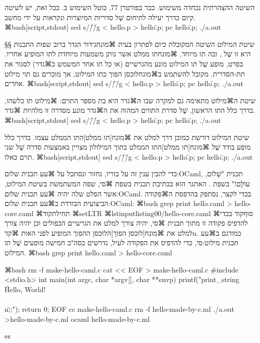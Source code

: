 השיטה ההצהרתית נכחדה משימוש. כבר בפורטרן 77, בוטל השימוש
ב.
בכל זאת, יש לשיטה קיום כדרך יעילה לתיחום שֶׁל סדריות המיוצרות ונקראות על ידי מחשב.
⌘bash[script,stdout]
sed s/\'/\"/g < hello.p > hello\".p; pc hello\".p; ./a.out
\END

§§ שיטת המילוט
השיטה המקובלת כיום לפתרון בעית ⌘מונח{גידור הגדר} ברוב שפות התכנות היא זו שֶׁל
, ובה תו מיוחד, ⌘מונח{תו ממלט} אשר נותן משמעות מיוחדת לתו המופיע אחריו.
בפרט, מופע שֶׁל תו המילוט מונע מהגרשיים (או כל תו אחר המשמש כ⌘גדר) לסגור את
תת-הסדרית. מקובל להשתמש ב⌘מונח{לוכסן הפוך} כתו המילוט, אך מוכרים גם תוי מילוט
אחרים.
⌘bash[script,stdout]
sed s/\'/\"/g < hello.p > hello\".p; pc hello\".p; ./a.out
\END

שיטת ה⌘מילוט מתאימה גם למקרה שבו ה⌘גדר היא בת מספר התוים: ⌘מילוט תו כלשהו, בדרך
כלל התו הראשון, שֶׁל סדרת התווים המהוה את ה⌘גדר מונע מסדרה זו מלהיות ⌘גדר.
⌘bash[script,stdout]
sed s/\'/\"/g < hello.p > hello\".p; pc hello\".p; ./a.out
\END

שיטת המילוט דורשת כמובן דרך למלט את ⌘מונח[תו ממלט]{התו הממלט} עצמו. בדרך כלל
מופע בודד שֶׁל ⌘מונח[תו ממלט]{התו הממלט} בתוך המילולון מצויין באמצעות סדרה שֶׁל
שני תוים כאלו.
⌘bash[script,stdout]
sed s/\'/\"/g < hello.p > hello\".p; pc hello\".p; ./a.out
\END

כדי להבין ענין זה על בוריו, נחזור ונסתכל על ⌘עע תכנית שלום:OCaml, תכנית
"שָׁלוֹם, עוֹלָם!" בשפת . האתגר הוא בכתיבת תכנית בשפת ⌘סי, שפה המשתמשת
בשיטת המילוט, אשר הפלט שלה יהיה ⌘עע תכנית שלום:OCaml. בכדי לקצר, נסתפק בהדפסת
ה⌘פקודה הביצועית הבודדת ב⌘עע תכנית שלום:OCaml{}:
⌘bash
grep print hello.caml > hello-core.caml
\END
⌘תחילת{קוד}
⌘setLTR
\lstset{language=[Objective]Caml,style=display}
⌘lstinputlisting{00/hello-core.caml}
⌘סוף{קוד}
בכדי להדפיס פקודה זו מתוך תכנית ⌘סי, יהיה צורך למלט את הגרשיים הכפולים וכן
יהיה צורך למלט את ⌘מונח[לוכסן הפוך]{הלוכסן ההפוך} המופיע לפני האות ⌘קד{n}.
כמודגם ב⌘עע תכנית מילוט:סי, כדי להדפיס את הפקודה לעיל, נדרשים בסה"כ חמישה
מופעים שֶׁל תו המילוט.
⌘bash
grep print hello.caml > hello-core.caml
\END

⌘bash
rm -f make-hello-caml.c
cat << EOF > make-hello-caml.c
#include <stdio.h>
int main(int argc, char *argv[], char **envp) {
  printf("print_string \"Hello, World!\\\\n\";;\n");
  return 0;
}
EOF
cc make-hello-caml.c
rm -f hello-made-by-c.ml
./a.out >hello-made-by-c.ml
ocaml hello-made-by-c.ml
\END

{¢¢
\setLTR

}

